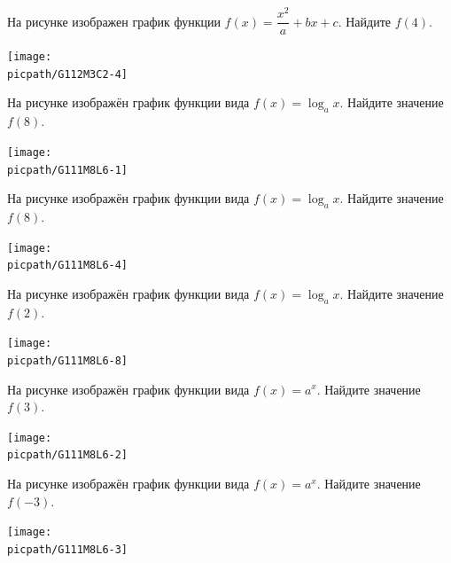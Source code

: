 \begin{class}[number=6]
	\begin{listofex}
		\item
		\begin{minipage}[t]{\bodywidth}
			На рисунке изображен график функции \( f(x)=\dfrac{x^2}{a}+bx+c \). Найдите \( f(4) \).
		\end{minipage}
		\begin{minipage}[t]{\picwidth}
			\texttt{[image: \\picpath/G112M3C2-4]}
		\end{minipage}
		\item
		\begin{minipage}[t]{\bodywidth}
			На рисунке изображён график функции вида \(f(x)= \log_ax\). Найдите значение \(f(8)\).
		\end{minipage}
		\begin{minipage}[t]{\picwidth}
			\texttt{[image: \\picpath/G111M8L6-1]}
		\end{minipage}
		\item
		\begin{minipage}[t]{\bodywidth}
			На рисунке изображён график функции вида \(f(x)= \log_a x\). Найдите значение \(f(8)\).
		\end{minipage}
		\begin{minipage}[t]{\picwidth}
			\texttt{[image: \\picpath/G111M8L6-4]}
		\end{minipage}
		\item
		\begin{minipage}[t]{\bodywidth}
			На рисунке изображён график функции вида \(f(x)= \log_ax\). Найдите значение \(f(2)\).
		\end{minipage}
		\begin{minipage}[t]{\picwidth}
			\texttt{[image: \\picpath/G111M8L6-8]}
		\end{minipage}
		\item
		\begin{minipage}[t]{\bodywidth}
			На рисунке изображён график функции вида \(f(x)= a^x\). Найдите значение \(f(3)\).
		\end{minipage}
		\begin{minipage}[t]{\picwidth}
			\texttt{[image: \\picpath/G111M8L6-2]}
		\end{minipage}
		\item
		\begin{minipage}[t]{\bodywidth}
			На рисунке изображён график функции вида \(f(x)= a^x\). Найдите значение \(f(-3)\).
		\end{minipage}
		\begin{minipage}[t]{\picwidth}
			\texttt{[image: \\picpath/G111M8L6-3]}
		\end{minipage}
		

\end{listofex}
\end{class}
